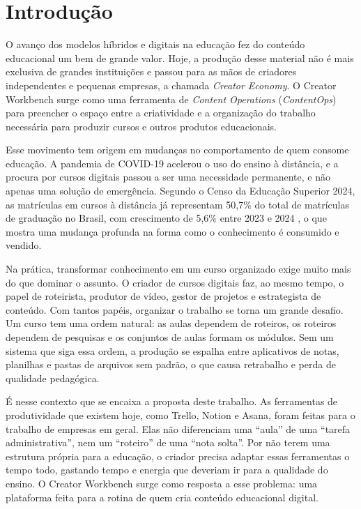 \chapter{Introdução}

O avanço dos modelos híbridos e digitais na educação fez do conteúdo educacional um bem de grande valor. Hoje, a produção desse material não é mais exclusiva de grandes instituições e passou para as mãos de criadores independentes e pequenas empresas, a chamada \textit{Creator Economy}. O Creator Workbench surge como uma ferramenta de \textit{Content Operations} (\textit{ContentOps}) para preencher o espaço entre a criatividade e a organização do trabalho necessária para produzir cursos e outros produtos educacionais.

Esse movimento tem origem em mudanças no comportamento de quem consome educação. A pandemia de COVID-19 acelerou o uso do ensino à distância, e a procura por cursos digitais passou a ser uma necessidade permanente, e não apenas uma solução de emergência. Segundo o Censo da Educação Superior 2024, as matrículas em cursos à distância já representam 50,7\% do total de matrículas de graduação no Brasil, com crescimento de 5,6\% entre 2023 e 2024 \cite{inep2025censo}, o que mostra uma mudança profunda na forma como o conhecimento é consumido e vendido.

Na prática, transformar conhecimento em um curso organizado exige muito mais do que dominar o assunto. O criador de cursos digitais faz, ao mesmo tempo, o papel de roteirista, produtor de vídeo, gestor de projetos e estrategista de conteúdo. Com tantos papéis, organizar o trabalho se torna um grande desafio. Um curso tem uma ordem natural: as aulas dependem de roteiros, os roteiros dependem de pesquisas e os conjuntos de aulas formam os módulos. Sem um sistema que siga essa ordem, a produção se espalha entre aplicativos de notas, planilhas e pastas de arquivos sem padrão, o que causa retrabalho e perda de qualidade pedagógica.

É nesse contexto que se encaixa a proposta deste trabalho. As ferramentas de produtividade que existem hoje, como Trello, Notion e Asana, foram feitas para o trabalho de empresas em geral. Elas não diferenciam uma ``aula'' de uma ``tarefa administrativa'', nem um ``roteiro'' de uma ``nota solta''. Por não terem uma estrutura própria para a educação, o criador precisa adaptar essas ferramentas o tempo todo, gastando tempo e energia que deveriam ir para a qualidade do ensino. O Creator Workbench surge como resposta a esse problema: uma plataforma feita para a rotina de quem cria conteúdo educacional digital.

